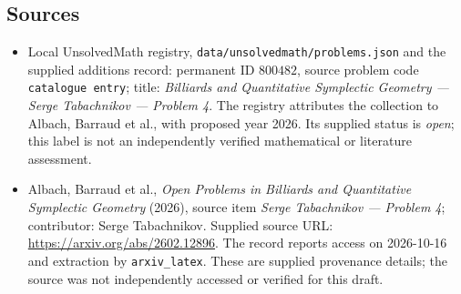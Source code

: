\documentclass[11pt]{article}
\begin{document}
\subsection{Sources}
\begin{itemize}
\item Local UnsolvedMath registry, \texttt{data/unsolvedmath/problems.json} and the supplied additions record: permanent ID \(800482\), source problem code \texttt{catalogue entry}; title: \emph{Billiards and Quantitative Symplectic Geometry --- Serge Tabachnikov --- Problem 4}. The registry attributes the collection to Albach, Barraud et al., with proposed year 2026. Its supplied status is \emph{open}; this label is not an independently verified mathematical or literature assessment.
\item Albach, Barraud et al., \emph{Open Problems in Billiards and Quantitative Symplectic Geometry} (2026), source item \emph{Serge Tabachnikov --- Problem 4}; contributor: Serge Tabachnikov. Supplied source URL: \url{https://arxiv.org/abs/2602.12896}. The record reports access on 2026-10-16 and extraction by \texttt{arxiv\_latex}. These are supplied provenance details; the source was not independently accessed or verified for this draft.
\end{itemize}
\end{document}
